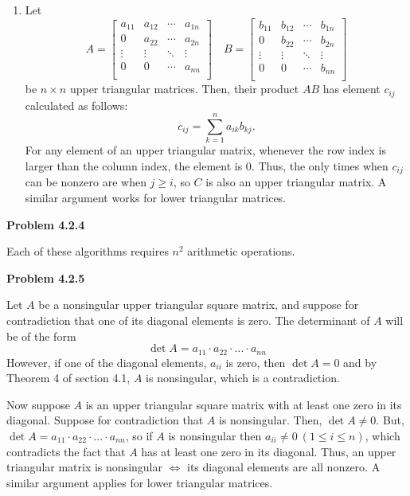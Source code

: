 \documentclass{article}
\newcommand{\Problem}[1]{\textbf{Problem #1}}
\begin{document}
\begin{enumerate}
\item Let 
\begin{equation*}
A = 
\begin{bmatrix}
a_{11} & a_{12} & \cdots & a_{1n}\\
0 & a_{22} &\cdots & a_{2n}\\
\vdots & \vdots & \ddots & \vdots\\
0 & 0 & \cdots & a_{nn}\\
\end{bmatrix}
\quad 
B = 
\begin{bmatrix}
b_{11} & b_{12} & \cdots & b_{1n}\\
0 & b_{22} &\cdots & b_{2n}\\
\vdots & \vdots & \ddots & \vdots\\
0 & 0 & \cdots & b_{nn}\\
\end{bmatrix}
\end{equation*}
be $n \times n$ upper triangular matrices. Then, their product $AB$ has element $c_{ij}$ calculated as follows:
\begin{equation*}
	c_{ij} = \displaystyle\sum_{k=1}^n a_{ik}b_{kj}. 
\end{equation*}
For any element of an upper triangular matrix, whenever the row index is larger than the column index, the element is 0. Thus, the only times when $c_{ij}$ can be nonzero are when $j \geq i$, so $C$ is also an upper triangular matrix. A similar argument works for lower triangular matrices. 

\end{enumerate}

\Problem{4.2.4}

Each of these algorithms requires $n^2$ arithmetic operations. 

\Problem{4.2.5}

Let $A$ be a nonsingular upper triangular square matrix, and suppose for contradiction that one of its diagonal elements is zero. The determinant of $A$ will be of the form
\begin{equation*}
\det{A} = a_{11}\cdot a_{22}\cdot ... \cdot a_{nn}	
\end{equation*}
However, if one of the diagonal elements, $a_{ii}$ is zero, then $\det{A} = 0$ and by Theorem 4 of section 4.1, $A$ is nonsingular, which is a contradiction. 

Now suppose $A$ is an upper triangular square matrix with at least one zero in its diagonal. Suppose for contradiction that $A$ is nonsingular. Then, $\det{A} \neq 0$. But, $\det{A} = a_{11}\cdot a_{22} \cdot ... \cdot a_{nn}$, so if $A$ is nonsingular then $a_{ii} \neq 0\ (1 \leq i \leq n)$, which contradicts the fact that $A$ has at least one zero in its diagonal. Thus, an upper triangular matrix is nonsingular $\iff$ its diagonal elements are all nonzero. A similar argument applies for lower triangular matrices. 
\end{document}
